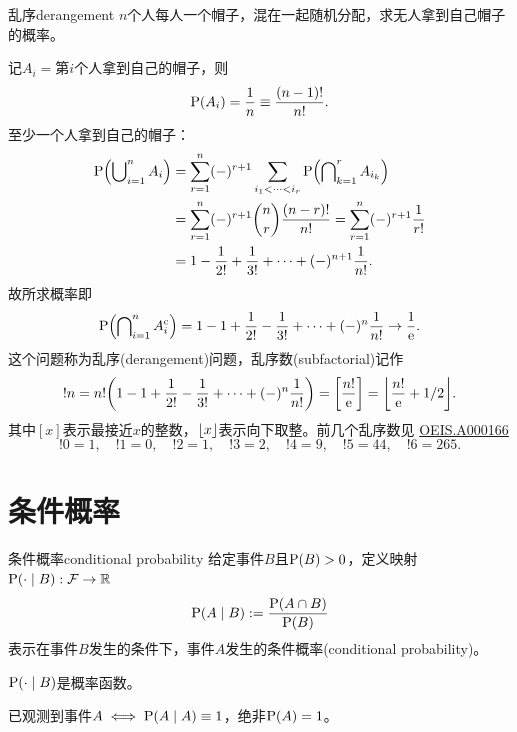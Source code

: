 \begin{example}{乱序}{derangement}
	$n$个人每人一个帽子，混在一起随机分配，求无人拿到自己帽子的概率。

	记$A_i =$第$i$个人拿到自己的帽子，则
	\[
		\P(A_i) = \frac1n \equiv \frac{(n - 1)!}{n!}.
	\]
	至少一个人拿到自己的帽子：
	\begin{align*}
		\P\Bigp{\bigcup\nolimits_{i=1}^nA_i} &= \sum_{r=1}^n(-)^{r+1}\sum_{i_1<\cdots<i_r}\P\Bigp{\bigcap\nolimits_{k=1}^rA_{i_k}}\\
		&= \sum_{r=1}^n(-)^{r+1}\binom nr\frac{(n - r)!}{n!} = \sum_{r=1}^n(-)^{r+1}\frac1{r!}\\
		&= 1 - \frac1{2!} + \frac1{3!} + \cdots + (-)^{n+1}\frac1{n!}.
	\end{align*}
	故所求概率即
	\[
		\P\Bigp{\bigcap\nolimits_{i=1}^nA_i\eventcomp} = 1 - 1 + \frac1{2!} - \frac1{3!} + \cdots + (-)^n\frac1{n!} \to \frac1{\e}.
	\]
	\tcblower
	这个问题称为乱序(derangement)问题，乱序数(subfactorial)记作
	\begin{equation}
		\label{eqn:subfactorial}
		!n = n!\biggp{1 - 1 + \frac1{2!} - \frac1{3!} + \cdots + (-)^n\frac1{n!}} = \biggb{\frac{n!}{\e}} = \biggfloor{\frac{n!}{\e} + 1/2}.
	\end{equation}
	其中$[x]$表示最接近$x$的整数，$\floor x$表示向下取整。前几个乱序数见 \href{https://oeis.org/A000166}{OEIS.A000166}
	\[
		!0 = 1,\quad !1 = 0,\quad !2 = 1,\quad !3 = 2,\quad !4 = 9,\quad !5 = 44,\quad !6 = 265.%
	\]	
\end{example}

\section{条件概率}

\begin{definition}{条件概率}{conditional probability}
	给定事件$B$且$\P(B) > 0$，定义映射$\P(\cdot \mid B):\eventspace \to \RR$
	\begin{equation}
		\P(A \mid B) := \frac{\P(A \cap B)}{\P(B)}
	\end{equation}
	表示在事件$B$发生的条件下，事件$A$发生的条件概率(conditional probability)。
\end{definition}

\begin{corollary}
	$\P(\cdot \mid B)$是概率函数。
\end{corollary}

\begin{corollary}
	已观测到事件$A \iff \P(A \mid A) \equiv 1$，绝非$\P(A) = 1$。
\end{corollary}

